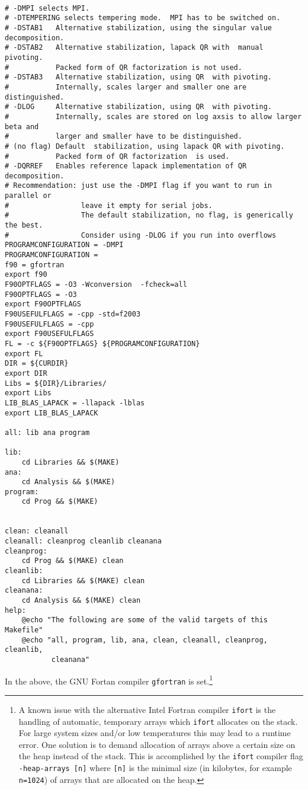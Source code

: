 \begin{lstlisting}[style=bash]

# -DMPI selects MPI.
# -DTEMPERING selects tempering mode.  MPI has to be switched on.
# -DSTAB1   Alternative stabilization, using the singular value decomposition.
# -DSTAB2   Alternative stabilization, lapack QR with  manual pivoting.
#           Packed form of QR factorization is not used.
# -DSTAB3   Alternative stabilization, using QR  with pivoting.
#           Internally, scales larger and smaller one are distinguished.
# -DLOG     Alternative stabilization, using QR  with pivoting.
#           Internally, scales are stored on log axsis to allow larger beta and
#           larger and smaller have to be distinguished.
# (no flag) Default  stabilization, using lapack QR with pivoting. 
#           Packed form of QR factorization  is used. 
# -DQRREF   Enables reference lapack implementation of QR decomposition.
# Recommendation: just use the -DMPI flag if you want to run in parallel or 
#                 leave it empty for serial jobs.  
#                 The default stabilization, no flag, is generically the best. 
#                 Consider using -DLOG if you run into overflows
PROGRAMCONFIGURATION = -DMPI 
PROGRAMCONFIGURATION = 
f90 = gfortran
export f90
F90OPTFLAGS = -O3 -Wconversion  -fcheck=all
F90OPTFLAGS = -O3
export F90OPTFLAGS
F90USEFULFLAGS = -cpp -std=f2003
F90USEFULFLAGS = -cpp
export F90USEFULFLAGS
FL = -c ${F90OPTFLAGS} ${PROGRAMCONFIGURATION}
export FL
DIR = ${CURDIR}
export DIR
Libs = ${DIR}/Libraries/
export Libs
LIB_BLAS_LAPACK = -llapack -lblas
export LIB_BLAS_LAPACK

all: lib ana program

lib:
	cd Libraries && $(MAKE)
ana:
	cd Analysis && $(MAKE)
program:
	cd Prog && $(MAKE)


clean: cleanall
cleanall: cleanprog cleanlib cleanana
cleanprog:
	cd Prog && $(MAKE) clean
cleanlib:
	cd Libraries && $(MAKE) clean
cleanana:
	cd Analysis && $(MAKE) clean
help:
	@echo "The following are some of the valid targets of this Makefile"
	@echo "all, program, lib, ana, clean, cleanall, cleanprog, cleanlib,
	       cleanana"

\end{lstlisting}
In the above, the GNU Fortan compiler \texttt{gfortran} is set.\footnote{A known issue with the alternative Intel Fortran compiler \texttt{ifort} is the handling of automatic, temporary arrays 
which \texttt{ifort} allocates on the stack. For large system sizes and/or low temperatures this may lead to 
a runtime error. One solution is to demand allocation of arrays above a certain size on the heap instead of the stack. 
This is accomplished by the \texttt{ifort} compiler flag \texttt{-heap-arrays [n]} where \texttt{[n]} is the minimal size (in kilobytes, for example \texttt{n=1024}) of arrays 
that are allocated on the heap.}
